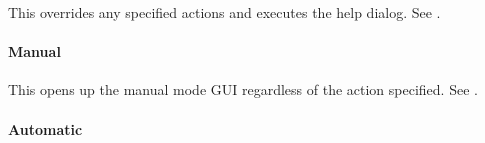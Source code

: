 \documentclass[letterpaper,11pt,english]{sphinxmanual}
\begin{document}
\begin{savenotes}\begin{fulllineitems}
\label{\detokenize{user/command_line:cmdoption-help}}
\pysigstartsignatures
{}
\pysigstopsignatures
\end{fulllineitems}\end{savenotes}


\sphinxAtStartPar
This overrides any specified actions and executes the help dialog. See
{\hyperref[\detokenize{user/command_line:user-command-line-available-actions-help}]{}}.


\paragraph{Manual}
\label{\detokenize{user/command_line:id2}}

\begin{savenotes}\begin{fulllineitems}
\label{\detokenize{user/command_line:cmdoption-manual}}
\pysigstartsignatures
{}
\pysigstopsignatures
\end{fulllineitems}\end{savenotes}


\sphinxAtStartPar
This opens up the manual mode GUI regardless of the action specified. See {\hyperref[\detokenize{user/command_line:user-command-line-available-actions-manual}]{}}.


\paragraph{Automatic}
\label{\detokenize{user/command_line:id3}}
\end{document}
